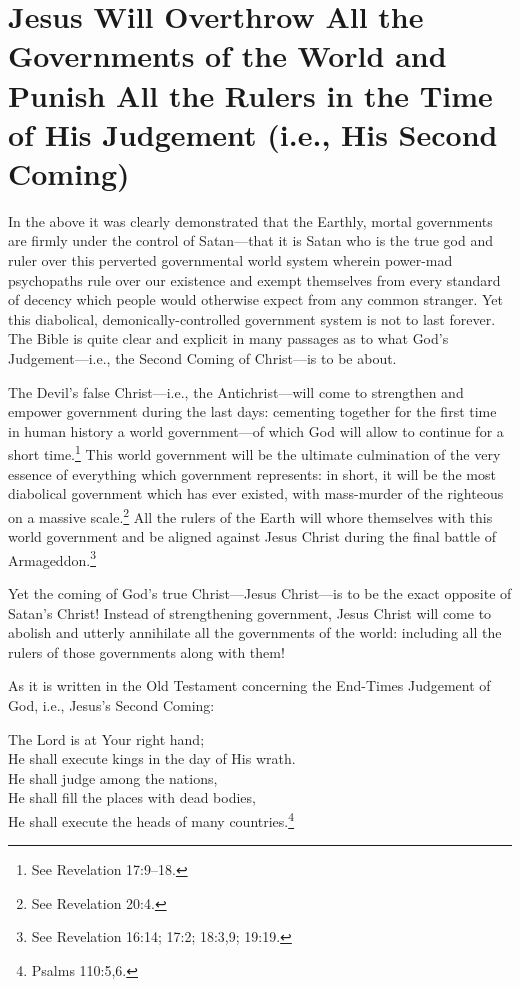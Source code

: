 \documentclass[letterpaper,12pt]{article}
\newenvironment{sverse}
  {\small\verse}
  {\endverse\normalsize}
\begin{document}
\section{Jesus Will Overthrow All the Governments of the World and Punish All the Rulers in the Time of His Judgement (i.e., His Second Coming)}
\label{sec:JesusWillOverthrowAllTheGovernmentsOfTheWorld}

In the above it was clearly demonstrated that the Earthly, mortal governments are firmly under the control of Satan---that it is Satan who is the true god and ruler over this perverted governmental world system wherein power-mad psychopaths rule over our existence and exempt themselves from every standard of decency which people would otherwise expect from any common stranger. Yet this diabolical, demonically-controlled government system is not to last forever. The Bible is quite clear and explicit in many passages as to what God's Judgement---i.e., the Second Coming of Christ---is to be about.

The Devil's false Christ---i.e., the Antichrist---will come to strengthen and empower government during the last days: cementing together for the first time in human history a world government---of which God will allow to continue for a short time.\footnote{See Revelation 17:9--18.} This world government will be the ultimate culmination of the very essence of everything which government represents: in short, it will be the most diabolical government which has ever existed, with mass-murder of the righteous on a massive scale.\footnote{See Revelation 20:4.} All the rulers of the Earth will whore themselves with this world government and be aligned against Jesus Christ during the final battle of Armageddon.\footnote{See Revelation 16:14; 17:2; 18:3,9; 19:19.}

Yet the coming of God's true Christ---Jesus Christ---is to be the exact opposite of Satan's Christ! Instead of strengthening government, Jesus Christ will come to abolish and utterly annihilate all the governments of the world: including all the rulers of those governments along with them!

As it is written in the Old Testament concerning the End-Times Judgement of God, i.e., Jesus's Second Coming:

\begin{sverse}
The Lord is at Your right hand;\\
He shall execute kings in the day of His wrath.\\
He shall judge among the nations,\\
He shall fill the places with dead bodies,\\
He shall execute the heads of many countries.\footnote{Psalms 110:5,6.}
\end{sverse}
\end{document}

